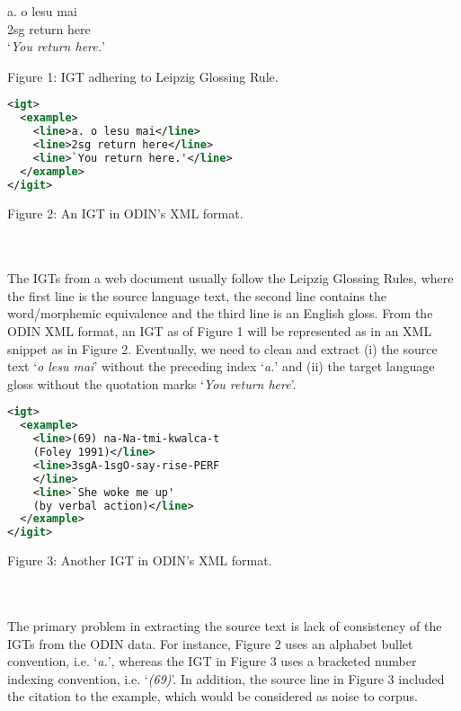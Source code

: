 \documentclass[11pt]{article}
\begin{document}
\begin{minipage}{\columnwidth}

a. \quad o lesu mai \\
\indent \qquad 2sg return here \\
\indent \qquad `\emph{You return here.}' \\

\centerline{Figure 1: IGT adhering to Leipzig Glossing Rule.}
\end{minipage}

\begin{minipage}{\columnwidth}
\begin{lstlisting}[language=XML]
<igt>
  <example>
    <line>a. o lesu mai</line>
    <line>2sg return here</line>
    <line>`You return here.'</line>
  </example>
</igit>
\end{lstlisting} 
\centerline{Figure 2: An IGT in ODIN's XML format.}
\end{minipage}
\\ \\
\noindent The IGTs from a web document usually follow the Leipzig Glossing Rules, where the first line is the source language text, the second line contains the word/morphemic equivalence and the third line is an English gloss. From the ODIN XML format, an IGT as of Figure 1 will be represented as in an XML snippet as in Figure 2. Eventually, we need to clean and extract (i) the source text `\emph{o lesu mai}' without the preceding index `\emph{a.}' and (ii) the target language gloss without the quotation marks `\emph{You return here}'.
\begin{minipage}{\columnwidth}
\begin{lstlisting}[language=XML]
<igt>
  <example>
    <line>(69) na-Na-tmi-kwalca-t 
    (Foley 1991)</line>
    <line>3sgA-1sgO-say-rise-PERF
    </line>
    <line>`She woke me up' 
    (by verbal action)</line>
  </example>
</igit>
\end{lstlisting} 
\smallskip
\centerline{Figure 3: Another IGT in ODIN's XML format.}
\end{minipage}
\\ \\
\noindent The primary problem in extracting the source text is lack of consistency of the IGTs from the ODIN data. For instance, Figure 2 uses an alphabet bullet convention, i.e. `\emph{a.}', whereas the IGT in Figure 3 uses a bracketed number indexing convention, i.e. `\emph{(69)}'. In addition, the source line in Figure 3 included the citation to the example, which would be considered as noise to corpus.
\end{document}
